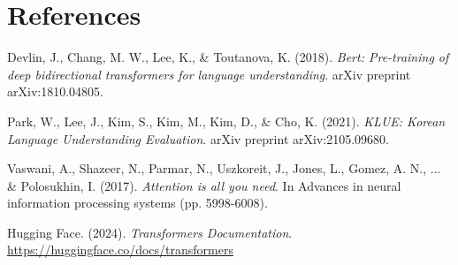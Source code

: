 \documentclass{article}
\begin{document}
\section{References}
\begin{thebibliography}{99}

Devlin, J., Chang, M. W., Lee, K., \& Toutanova, K. (2018). \textit{Bert: Pre-training of deep bidirectional transformers for language understanding}. arXiv preprint arXiv:1810.04805.

Park, W., Lee, J., Kim, S., Kim, M., Kim, D., \& Cho, K. (2021). \textit{KLUE: Korean Language Understanding Evaluation}. arXiv preprint arXiv:2105.09680.

Vaswani, A., Shazeer, N., Parmar, N., Uszkoreit, J., Jones, L., Gomez, A. N., ... \& Polosukhin, I. (2017). \textit{Attention is all you need}. In Advances in neural information processing systems (pp. 5998-6008).

Hugging Face. (2024). \textit{Transformers Documentation}. \url{https://huggingface.co/docs/transformers}

\end{thebibliography}
\end{document}

